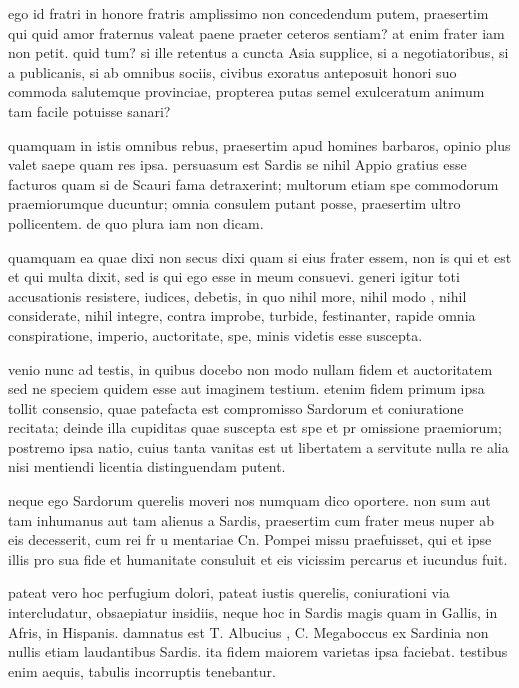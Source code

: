 ego id fratri in honore fratris amplissimo non concedendum putem, praesertim qui quid amor fraternus valeat paene praeter ceteros sentiam? at enim frater iam non petit. quid tum? si ille retentus a cuncta Asia supplice, si a negotiatoribus, si a publicanis, si ab omnibus sociis, civibus exoratus anteposuit honori suo commoda salutemque provinciae, propterea putas semel exulceratum animum tam facile potuisse sanari?

 quamquam in istis omnibus rebus, praesertim apud homines barbaros, opinio plus valet saepe quam res ipsa. persuasum est Sardis se nihil Appio gratius esse facturos quam si de Scauri fama detraxerint; multorum etiam spe commodorum praemiorumque ducuntur; omnia consulem putant posse, praesertim ultro pollicentem. de quo plura iam non dicam.

 quamquam ea quae dixi non secus dixi quam si eius frater essem, non is qui et est et qui multa dixit, sed is qui ego esse in meum consuevi. generi igitur toti accusationis resistere, iudices, debetis, in quo nihil more, nihil modo , nihil considerate, nihil integre, contra improbe, turbide, festinanter, rapide omnia conspiratione, imperio, auctoritate, spe, minis videtis esse suscepta.

 venio nunc ad testis, in quibus docebo non modo nullam fidem et auctoritatem sed ne speciem quidem esse aut imaginem testium. etenim fidem primum ipsa tollit consensio, quae patefacta est compromisso Sardorum et coniuratione recitata; deinde illa cupiditas quae suscepta est spe et pr omissione praemiorum; postremo ipsa natio, cuius tanta vanitas est ut libertatem a servitute nulla re alia nisi mentiendi licentia distinguendam putent.

 neque ego Sardorum querelis moveri nos numquam dico oportere. non sum aut tam inhumanus aut tam alienus a Sardis, praesertim cum frater meus nuper ab eis decesserit, cum rei fr u mentariae Cn. Pompei missu praefuisset, qui et ipse illis pro sua fide et humanitate consuluit et eis vicissim percarus et iucundus fuit.

 pateat vero hoc perfugium dolori, pateat iustis querelis, coniurationi via intercludatur, obsaepiatur insidiis, neque hoc in Sardis magis quam in Gallis, in Afris, in Hispanis. damnatus est T. Albucius , C. Megaboccus ex Sardinia non nullis etiam laudantibus Sardis. ita fidem maiorem varietas ipsa faciebat. testibus enim aequis, tabulis incorruptis tenebantur.

